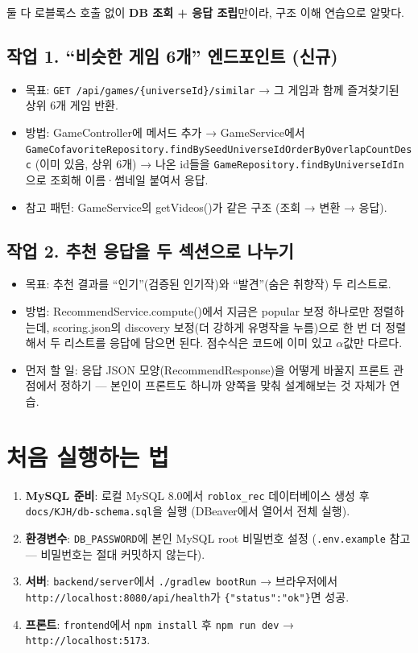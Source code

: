 \documentclass[11pt]{article}
\begin{document}
둘 다 로블록스 호출 없이 \textbf{DB 조회 + 응답 조립}만이라, 구조 이해 연습으로 알맞다.

\subsection*{작업 1. ``비슷한 게임 6개'' 엔드포인트 (신규)}
\begin{itemize}
  \item 목표: \texttt{GET /api/games/\{universeId\}/similar} → 그 게임과 함께
        즐겨찾기된 상위 6개 게임 반환.
  \item 방법: GameController에 메서드 추가 → GameService에서
        \texttt{GameCofavoriteRepository.findBySeedUniverseIdOrderByOverlapCountDesc}
        (이미 있음, 상위 6개) → 나온 id들을 \texttt{GameRepository.findByUniverseIdIn}으로
        조회해 이름·썸네일 붙여서 응답.
  \item 참고 패턴: GameService의 getVideos()가 같은 구조 (조회 → 변환 → 응답).
\end{itemize}

\subsection*{작업 2. 추천 응답을 두 섹션으로 나누기}
\begin{itemize}
  \item 목표: 추천 결과를 ``인기''(검증된 인기작)와 ``발견''(숨은 취향작) 두 리스트로.
  \item 방법: RecommendService.compute()에서 지금은 popular 보정 하나로만 정렬하는데,
        scoring.json의 discovery 보정(더 강하게 유명작을 누름)으로 한 번 더 정렬해서
        두 리스트를 응답에 담으면 된다. 점수식은 코드에 이미 있고 $\alpha$값만 다르다.
  \item 먼저 할 일: 응답 JSON 모양(RecommendResponse)을 어떻게 바꿀지 프론트 관점에서
        정하기 --- 본인이 프론트도 하니까 양쪽을 맞춰 설계해보는 것 자체가 연습.
\end{itemize}

\section{처음 실행하는 법}

\begin{enumerate}
  \item \textbf{MySQL 준비}: 로컬 MySQL 8.0에서 \texttt{roblox\_rec} 데이터베이스 생성 후
        \texttt{docs/KJH/db-schema.sql}을 실행 (DBeaver에서 열어서 전체 실행).
  \item \textbf{환경변수}: \texttt{DB\_PASSWORD}에 본인 MySQL root 비밀번호 설정
        (\texttt{.env.example} 참고 --- 비밀번호는 절대 커밋하지 않는다).
  \item \textbf{서버}: \texttt{backend/server}에서 \texttt{./gradlew bootRun} →
        브라우저에서 \texttt{http://localhost:8080/api/health}가
        \texttt{\{"status":"ok"\}}면 성공.
  \item \textbf{프론트}: \texttt{frontend}에서 \texttt{npm install} 후 \texttt{npm run dev}
        → \texttt{http://localhost:5173}.
\end{enumerate}
\end{document}
